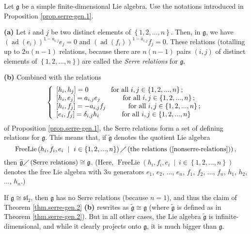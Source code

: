 \documentclass[etingof-lie.tex]{subfiles}
\begin{document}
\begin{theorem}
\label{thm.serre-gen.2}Let $\mathfrak{g}$ be a simple finite-dimensional Lie
algebra. Use the notations introduced in Proposition \ref{prop.serre-gen.1}.

\textbf{(a)} Let $i$ and $j$ be two distinct elements of $\left\{
1,2,...,n\right\}  $. Then, in $\mathfrak{g}$, we have $\left(
\operatorname*{ad}\left(  e_{i}\right)  \right)  ^{1-a_{i,j}}e_{j}=0$ and
$\left(  \operatorname*{ad}\left(  f_{i}\right)  \right)  ^{1-a_{i,j}}f_{j}%
=0$. These relations (totalling up to $2n\left(  n-1\right)  $ relations,
because there are $n\left(  n-1\right)  $ pairs $\left(  i,j\right)  $ of
distinct elements of $\left\{  1,2,...,n\right\}  $) are called the
\textit{Serre relations} for $\mathfrak{g}$.

\textbf{(b)} Combined with the relations%
\begin{equation}
\left\{
\begin{array}
[c]{l}%
\left[  h_{i},h_{j}\right]  =0\ \ \ \ \ \ \ \ \ \ \text{for all }%
i,j\in\left\{  1,2,...,n\right\}  ;\\
\left[  h_{i},e_{j}\right]  =a_{i,j}e_{j}\ \ \ \ \ \ \ \ \ \ \text{for all
}i,j\in\left\{  1,2,...,n\right\}  ;\\
\left[  h_{i},f_{j}\right]  =-a_{i,j}f_{j}\ \ \ \ \ \ \ \ \ \ \text{for all
}i,j\in\left\{  1,2,...,n\right\}  ;\\
\left[  e_{i},f_{j}\right]  =\delta_{i,j}h_{i}\ \ \ \ \ \ \ \ \ \ \text{for
all }i,j\in\left\{  1,2,...,n\right\}
\end{array}
\right.  \label{nonserre-relations}%
\end{equation}
of Proposition \ref{prop.serre-gen.1}, the Serre relations form a set of
defining relations for $\mathfrak{g}$. This means that, if
$\widetilde{\mathfrak{g}}$ denotes the quotient Lie algebra
\[
\operatorname*{FreeLie}\left(  h_{i},f_{i},e_{i}\ \mid\ i\in\left\{
1,2,...,n\right\}  \right)  \diagup\left(  \text{the relations
(\ref{nonserre-relations})}\right)  ,
\]
then $\widetilde{\mathfrak{g}}\diagup\left(  \text{Serre relations}\right)
\cong\mathfrak{g}$. (Here, $\operatorname*{FreeLie}\left(  h_{i},f_{i}%
,e_{i}\ \mid\ i\in\left\{  1,2,...,n\right\}  \right)  $ denotes the free Lie
algebra with $3n$ generators $e_{1}$, $e_{2}$, $...$, $e_{n}$, $f_{1}$,
$f_{2}$, $...$, $f_{n}$, $h_{1}$, $h_{2}$, $...$, $h_{n}$.)
\end{theorem}

\begin{remark}
If $\mathfrak{g}\cong\mathfrak{sl}_{2}$, then $\mathfrak{g}$ has no Serre
relations (because $n=1$), and thus the claim of Theorem \ref{thm.serre-gen.2}
\textbf{(b)} rewrites as $\widetilde{\mathfrak{g}}\cong\mathfrak{g}$ (where
$\widetilde{\mathfrak{g}}$ is defined as in Theorem \ref{thm.serre-gen.2}).
But in all other cases, the Lie algebra $\widetilde{\mathfrak{g}}$ is
infinite-dimensional, and while it clearly projects onto $\mathfrak{g}$, it is
much bigger than $\mathfrak{g}$.
\end{remark}
\end{document}
